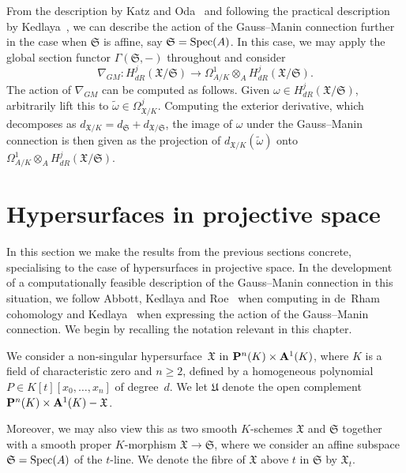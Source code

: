 \begin{rem}
From the description by Katz and Oda~\citep{KatzOda1968} and following the 
practical description by Kedlaya~\citep{Kedlaya2008}, we can describe the 
action of the Gauss--Manin connection further in the case when $\mathfrak{S}$ 
is affine, say $\mathfrak{S} = \operatorname{Spec}(A)$.  In this case, we may apply the 
global section functor $\Gamma(\mathfrak{S}, -)$ throughout and consider
\begin{equation*}
\nabla_{GM} \colon H_{dR}^j(\mathfrak{X}/\mathfrak{S}) \to 
    \Omega_{A/K}^1 \otimes_{A} H_{dR}^j(\mathfrak{X}/\mathfrak{S}).
\end{equation*}
The action of $\nabla_{GM}$ can be computed as follows.  Given 
$\omega \in H_{dR}^j(\mathfrak{X}/\mathfrak{S})$, arbitrarily lift this to 
$\tilde{\omega} \in \Omega_{\mathfrak{X}/K}^j$.  Computing the 
exterior derivative, which decomposes as 
$d_{\mathfrak{X}/K} = d_{\mathfrak{S}} + d_{\mathfrak{X}/\mathfrak{S}}$, 
the image of $\omega$ under the Gauss--Manin connection is then given as 
the projection of $d_{\mathfrak{X}/K}(\tilde{\omega})$ onto 
$\Omega_{A/K}^1 \otimes_{A} H_{dR}^j(\mathfrak{X}/\mathfrak{S})$.
\end{rem}


\section{Hypersurfaces in projective space}
\label{sec:01-04-hypersurfaces}

In this section we make the results from the previous sections concrete, 
specialising to the case of hypersurfaces in projective space.  In the 
development of a computationally feasible description of the Gauss--Manin 
connection in this situation, we follow Abbott, Kedlaya and 
Roe~\citep[\S 3.2]{AbbottKedlayaRoe2006} when computing in 
de~Rham cohomology and Kedlaya~\citep[\S 3.2]{Kedlaya2008} when 
expressing the action of the Gauss--Manin connection.  We begin by recalling 
the notation relevant in this chapter.

\begin{notation} \label{not:01-04-main}
We consider a non-singular hypersurface~$\mathfrak{X}$ in 
$\mathbf{P}^n(K) \times \mathbf{A}^1(K)$, where $K$ is a field of characteristic 
zero and $n \geq 2$, defined by a homogeneous polynomial 
$P \in K[t][x_0, \dotsc, x_n]$ of degree~$d$.  We let $\mathfrak{U}$ denote 
the open complement $\mathbf{P}^n(K) \times \mathbf{A}^1(K) - \mathfrak{X}$.

Moreover, we may also view this as two smooth $K$-schemes 
$\mathfrak{X}$ and $\mathfrak{S}$ together with a smooth proper 
$K$-morphism $\mathfrak{X} \to \mathfrak{S}$, where we consider 
an affine subspace $\mathfrak{S} = \operatorname{Spec}(A)$ of the $t$-line.  
We denote the fibre of $\mathfrak{X}$ above $t$ in $\mathfrak{S}$ 
by $\mathfrak{X}_t$.
\end{notation}

